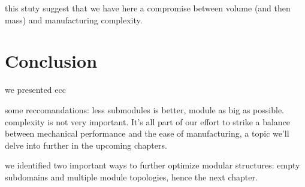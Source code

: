     this stuty suggest that we have here a compromise between volume (and then mass) and manufacturing complexity. 


\section{Conclusion}
we presented ecc

some reccomandations: less submodules is better, module as big as possible. complexity is not very important.
It's all part of our effort to strike a balance between mechanical performance and the ease of manufacturing, a topic we'll delve into further in the upcoming chapters.

we identified two important ways to further optimize modular structures: empty subdomains and multiple module topologies, hence the next chapter.